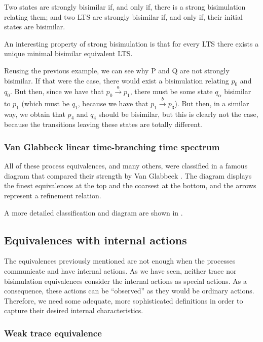 \documentclass[11pt]{article}
\theoremstyle{definition}
\theoremstyle{plain}
\begin{document}
Two states are strongly bisimilar if, and only if, there is a strong bisimulation relating them; and two LTS are strongly bisimilar if, and only if, their initial states are bisimilar.

An interesting property of strong bisimulation is that for every LTS there exists a unique minimal bisimilar equivalent LTS.

Reusing the previous example, we can see why P and Q are not strongly bisimilar. If that were the case, there would exist a bisimulation relating $ p_0 $ and $ q_0 $. But then, since we have that $ p_0 \xrightarrow{a}p_1 $, there must be some state $ q_\alpha $ bisimilar to $ p_1 $ (which must be $ q_1 $, because we have that $ p_1 \xrightarrow{b}p_3 $). But then, in a similar way, we obtain that $ p_4 $ and $ q_4 $ should be bisimilar, but this is clearly not the case, because the transitions leaving these states are totally different.

\subsubsection{Van Glabbeek linear time-branching time spectrum}

All of these process equivalences, and many others, were classified in a famous diagram that compared their strength by Van Glabbeek \cite{van1990linear}. The diagram displays the finest equivalences at the top and the coarsest at the bottom, and the arrows represent a refinement relation.

A more detailed classification and diagram are shown in \cite{DBLP:journals/corr/abs-1304-6574}.

\subsection{Equivalences with internal actions}
The equivalences previously mentioned are not enough when the processes communicate and have internal actions. As we have seen, neither trace nor bisimulation equivalences consider the internal actions as special actions. As a consequence, these actions can be ``observed'' as they would be ordinary actions. Therefore, we need some adequate, more sophisticated definitions in order to capture their desired internal characteristics.

\subsubsection{Weak trace equivalence}
\end{document}
